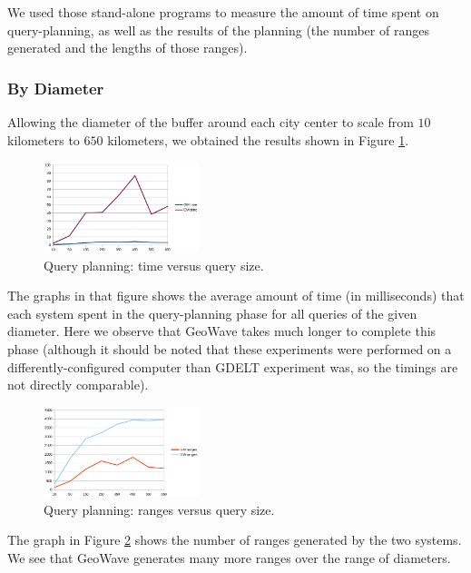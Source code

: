 We used those stand-alone programs to measure the amount of time spent on query-planning, as well as the results of the planning (the number of ranges generated and the lengths of those ranges).

\subsubsection{By Diameter}

Allowing the diameter of the buffer around each city center to scale from $10$ kilometers to $650$ kilometers,
we obtained the results shown in Figure \ref{planningsizetime}.

\begin{figure}[h!tb]
  \centering
  \includegraphics[width=0.40\textwidth]{../docs/img/query-planning/size-time.png}
  \caption{Query planning: time versus query size.}
  \label{planningsizetime}
\end{figure}

The graphs in that figure shows the average amount of time (in milliseconds) that each system spent in the query-planning phase for all queries of the given diameter.
Here we observe that GeoWave takes much longer to complete this phase (although it should be noted that these experiments were performed on a differently-configured computer than GDELT experiment was, so the timings are not directly comparable).

\begin{figure}[h!tb]
  \centering
  \includegraphics[width=0.40\textwidth]{../docs/img/query-planning/size-ranges.png}
  \caption{Query planning: ranges versus query size.}
  \label{planningsizeranges}
\end{figure}

The graph in Figure \ref{planningsizeranges} shows the number of ranges generated by the two systems.
We see that GeoWave generates many more ranges over the range of diameters.

